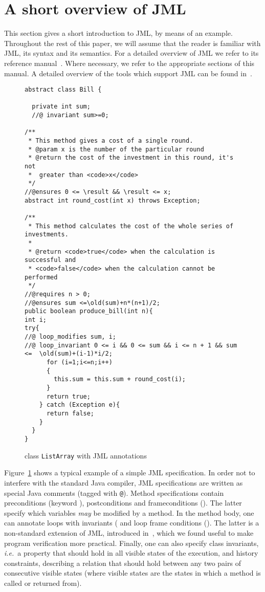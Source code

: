 \section{A short overview of JML}\label{SecJMLOverview}

This section gives a short introduction to JML, by means of an
example. Throughout the rest of this paper, we will assume that the
reader is familiar with JML, its syntax and its semantics. For a
detailed overview of JML we refer to its reference
manual~\cite{JMLReferenceManual05}. Where necessary, we refer to the
appropriate sections of this manual. A detailed overview of the tools
which support JML can be found in~\cite{BurdyCCEKLLP05}.

\lstset{numbers=left,numberstyle=\small,stepnumber=1,numbersep=5pt}
\begin{figure}[t]
\begin{lstlisting}[frame=trbl] 
abstract class Bill {
  
  private int sum;
  //@ invariant sum>=0;
 
/**
 * This method gives a cost of a single round.
 * @param x is the number of the particular round
 * @return the cost of the investment in this round, it's not
 *  greater than <code>x</code> 
 */ 
//@ensures 0 <= \result && \result <= x;
abstract int round_cost(int x) throws Exception;

/**
 * This method calculates the cost of the whole series of investments.
 *
 * @return <code>true</code> when the calculation is successful and
 * <code>false</code> when the calculation cannot be performed
 */
//@requires n > 0;
//@ensures sum <=\old(sum)+n*(n+1)/2;
public boolean produce_bill(int n){
int i;
try{
//@ loop_modifies sum, i;
//@ loop_invariant 0 <= i && 0 <= sum && i <= n + 1 && sum <=  \old(sum)+(i-1)*i/2;
      for (i=1;i<=n;i++) 
      {
        this.sum = this.sum + round_cost(i);
      }
      return true;
    } catch (Exception e){
      return false;
    }
  }
}
\end{lstlisting}
\caption{\sc class \mbox{\rm \lstinline!ListArray!} with JML annotations} 
\label{FigExampleJML}
\end{figure}

Figure~\ref{FigExampleJML} shows a typical example of a simple JML
specification.  In order not to interfere with the standard Java
compiler, JML specifications are written as special Java comments
(tagged with \texttt{@}). Method specifications contain preconditions
(keyword ), postconditions  and
frameconditions (). The latter specify which
variables \emph{may} be modified by a method. In the method body, one
can annotate loops with invariants ( and loop
frame conditions (). The latter is a
non-standard extension of JML, introduced in~\cite{BRL-JACK}, which we
found useful to make program verification more practical. Finally, one
can also specify class invariants, \emph{i.e.}\ a property that should
hold in all visible states of the execution, and history constraints,
describing a relation that should hold between any two pairs of
consecutive visible states (where visible states are the states in
which a method is called or returned from). 


